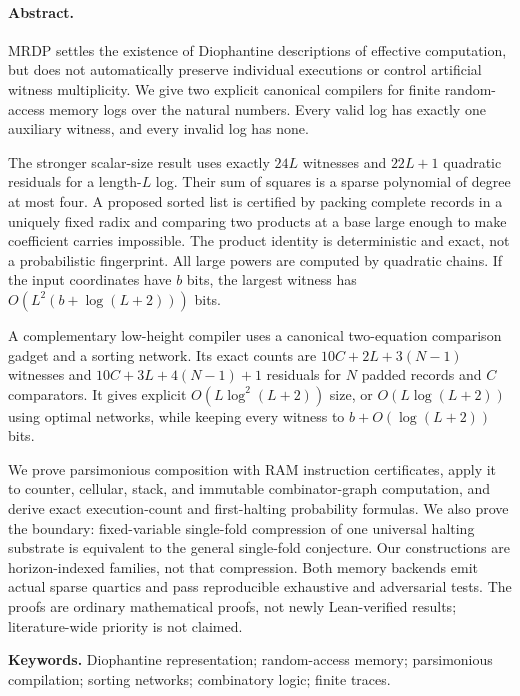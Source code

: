 \documentclass[11pt,a4paper]{article}
\theoremstyle{definition}
\theoremstyle{remark}
\begin{document}
\paragraph{Abstract.}
MRDP settles the existence of Diophantine descriptions of effective computation,
but does not automatically preserve individual executions or control artificial
witness multiplicity. We give two explicit canonical compilers for finite
random-access memory logs over the natural numbers. Every valid log has exactly
one auxiliary witness, and every invalid log has none.

The stronger scalar-size result uses exactly $24L$ witnesses and $22L+1$
quadratic residuals for a length-$L$ log. Their sum of squares is a sparse
polynomial of degree at most four. A proposed sorted list is certified by
packing complete records in a uniquely fixed radix and comparing two products
at a base large enough to make coefficient carries impossible. The product
identity is deterministic and exact, not a probabilistic fingerprint. All
large powers are computed by quadratic chains. If the input coordinates have
$b$ bits, the largest witness has $O(L^2(b+\log(L+2)))$ bits.

A complementary low-height compiler uses a canonical two-equation comparison
gadget and a sorting network. Its exact counts are $10C+2L+3(N-1)$ witnesses
and $10C+3L+4(N-1)+1$ residuals for $N$ padded records and $C$ comparators.
It gives explicit $O(L\log^2(L+2))$ size, or $O(L\log(L+2))$ using optimal
networks, while keeping every witness to $b+O(\log(L+2))$ bits.

We prove parsimonious composition with RAM instruction certificates, apply it
to counter, cellular, stack, and immutable combinator-graph computation, and
derive exact execution-count and first-halting probability formulas. We also
prove the boundary: fixed-variable single-fold compression of one universal
halting substrate is equivalent to the general single-fold conjecture. Our
constructions are horizon-indexed families, not that compression. Both memory
backends emit actual sparse quartics and pass reproducible exhaustive and
adversarial tests. The proofs are ordinary mathematical proofs, not newly
Lean-verified results; literature-wide priority is not claimed.

\vspace{0.3em}
\noindent\textbf{Keywords.} Diophantine representation; random-access memory;
parsimonious compilation; sorting networks; combinatory logic; finite traces.
\end{document}
